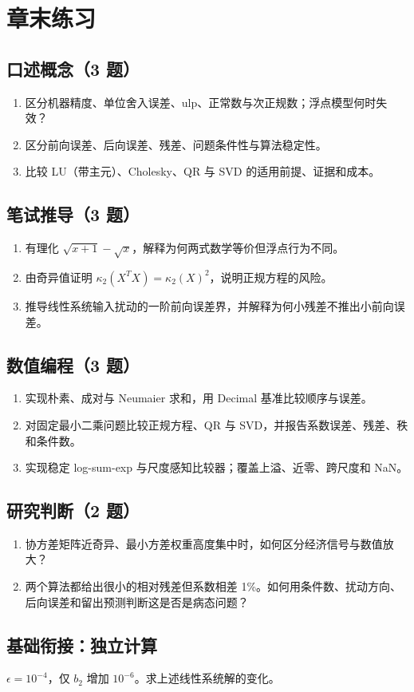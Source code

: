 \section*{章末练习}
\begingroup\small
\subsection*{口述概念（3 题）}
\begin{enumerate}[nosep,leftmargin=*]
\item 区分机器精度、单位舍入误差、ulp、正常数与次正规数；浮点模型何时失效？
\item 区分前向误差、后向误差、残差、问题条件性与算法稳定性。
\item 比较 LU（带主元）、Cholesky、QR 与 SVD 的适用前提、证据和成本。
\end{enumerate}
\subsection*{笔试推导（3 题）}
\begin{enumerate}[nosep,leftmargin=*,start=4]
\item 有理化 $\sqrt{x+1}-\sqrt{x}$，解释为何两式数学等价但浮点行为不同。
\item 由奇异值证明 $\kappa_2(X^TX)=\kappa_2(X)^2$，说明正规方程的风险。
\item 推导线性系统输入扰动的一阶前向误差界，并解释为何小残差不推出小前向误差。
\end{enumerate}
\subsection*{数值编程（3 题）}
\begin{enumerate}[nosep,leftmargin=*,start=7]
\item 实现朴素、成对与 Neumaier 求和，用 Decimal 基准比较顺序与误差。
\item 对固定最小二乘问题比较正规方程、QR 与 SVD，并报告系数误差、残差、秩和条件数。
\item 实现稳定 log-sum-exp 与尺度感知比较器；覆盖上溢、近零、跨尺度和 NaN。
\end{enumerate}
\subsection*{研究判断（2 题）}
\begin{enumerate}[nosep,leftmargin=*,start=10]
\item 协方差矩阵近奇异、最小方差权重高度集中时，如何区分经济信号与数值放大？
\item 两个算法都给出很小的相对残差但系数相差 1\%。如何用条件数、扰动方向、后向误差和留出预测判断这是否是病态问题？
\end{enumerate}
\endgroup


\MFQMappedUpperFourteenQuestions

\subsection*{基础衔接：独立计算}
$\epsilon=10^{-4}$，仅 $b_2$ 增加 $10^{-6}$。求上述线性系统解的变化。
